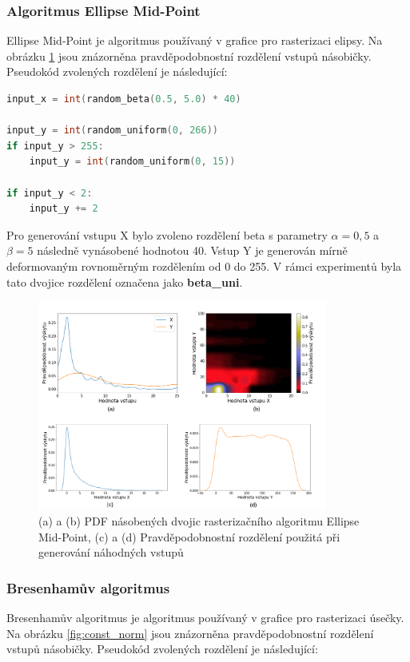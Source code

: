 \subsubsection{Algoritmus Ellipse Mid-Point}
Ellipse Mid-Point je algoritmus používaný v grafice pro rasterizaci elipsy. Na obrázku \ref{fig:beta_uni} jsou znázorněna pravděpodobnostní rozdělení vstupů násobičky. Pseudokód zvolených rozdělení je následující:

\begin{lstlisting}[language={C}, label={lst:ellipse}]
input_x = int(random_beta(0.5, 5.0) * 40)

input_y = int(random_uniform(0, 266))
if input_y > 255:
    input_y = int(random_uniform(0, 15))

if input_y < 2:
    input_y += 2
\end{lstlisting}

Pro generování vstupu X bylo zvoleno rozdělení beta s parametry $\alpha = 0,5$ a $\beta = 5$ následně vynásobené hodnotou 40. Vstup Y je generován mírně deformovaným rovnoměrným rozdělením od 0 do 255. V rámci experimentů byla tato dvojice rozdělení označena jako \textbf{beta\_uni}.

\begin{figure}[H]
    \centering
    \includegraphics[width=0.85\textwidth]{obrazky-figures/beta_uni_all.png}
    \caption{(a) a (b) PDF násobených dvojic rasterizačního algoritmu Ellipse Mid-Point, (c) a (d) Pravděpodobnostní rozdělení použitá při generování náhodných vstupů}
    \label{fig:beta_uni}
\end{figure}

\pagebreak

\subsubsection{Bresenhamův algoritmus}
Bresenhamův algoritmus je algoritmus používaný v grafice pro rasterizaci úsečky. Na obrázku \ref{fig:const_norm} jsou znázorněna pravděpodobnostní rozdělení vstupů násobičky. Pseudokód zvolených rozdělení je následující:

